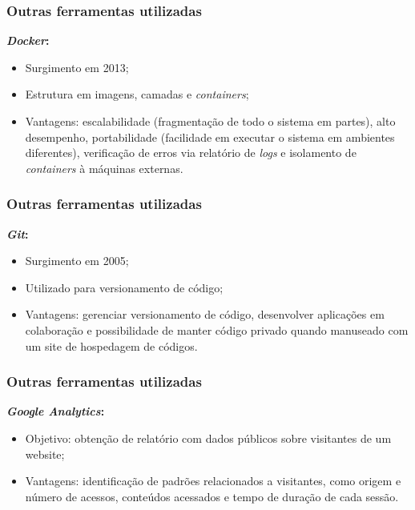 \documentclass[xcolor=table]{beamer}
\begin{document}
\begin{frame}
    \frametitle{Outras ferramentas utilizadas}
    \textbf{\textit{Docker}:} 
    \begin{itemize}
        \item Surgimento em 2013;
        \item Estrutura em imagens, camadas e \textit{containers};
        \item Vantagens: escalabilidade (fragmentação de todo o sistema em partes), alto desempenho, portabilidade (facilidade em executar o sistema em ambientes diferentes), verificação de erros via relatório de \textit{logs} e isolamento de \textit{containers} à máquinas externas. 
        
% 
% 

    \end{itemize}
    
\end{frame}

\begin{frame}
    \frametitle{Outras ferramentas utilizadas}
    \textbf{\textit{Git}:} 
    \begin{itemize}
        \item Surgimento em 2005;
        \item Utilizado para versionamento de código; %
        \item Vantagens: gerenciar versionamento de código, desenvolver aplicações em colaboração e possibilidade de manter código privado quando manuseado com um site de hospedagem de códigos.
    \end{itemize}
\end{frame}


\begin{frame}
    \frametitle{Outras ferramentas utilizadas}
    \textbf{\textit{Google Analytics}:} 
    \begin{itemize}
        \item Objetivo: obtenção de relatório com dados públicos sobre visitantes de um website;
        \item Vantagens: identificação de padrões relacionados a visitantes, como origem e número de acessos, conteúdos acessados e tempo de duração de cada sessão. %
    \end{itemize}
\end{frame}
\end{document}
